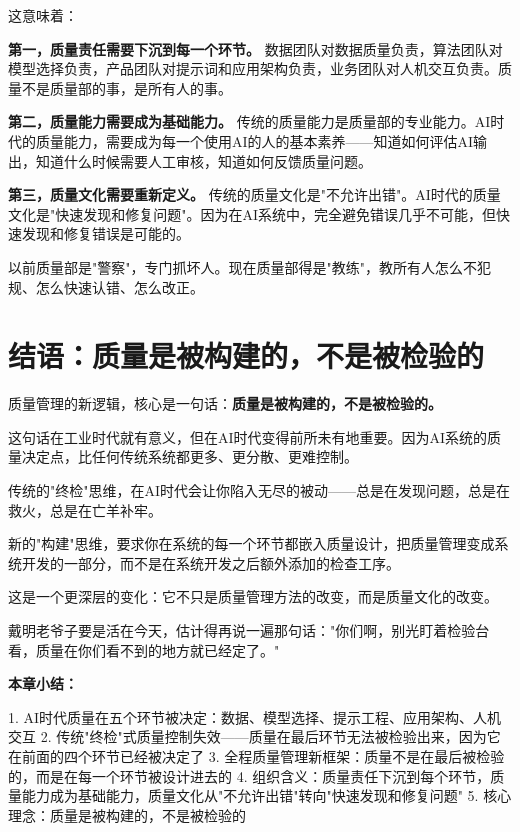 这意味着：

\textbf{第一，质量责任需要下沉到每一个环节。} 数据团队对数据质量负责，算法团队对模型选择负责，产品团队对提示词和应用架构负责，业务团队对人机交互负责。质量不是质量部的事，是所有人的事。

\textbf{第二，质量能力需要成为基础能力。} 传统的质量能力是质量部的专业能力。AI时代的质量能力，需要成为每一个使用AI的人的基本素养——知道如何评估AI输出，知道什么时候需要人工审核，知道如何反馈质量问题。

\textbf{第三，质量文化需要重新定义。} 传统的质量文化是"不允许出错"。AI时代的质量文化是"快速发现和修复问题"。因为在AI系统中，完全避免错误几乎不可能，但快速发现和修复错误是可能的。

以前质量部是"警察"，专门抓坏人。现在质量部得是"教练"，教所有人怎么不犯规、怎么快速认错、怎么改正。

\section{结语：质量是被构建的，不是被检验的}


质量管理的新逻辑，核心是一句话：\textbf{质量是被构建的，不是被检验的。}

这句话在工业时代就有意义，但在AI时代变得前所未有地重要。因为AI系统的质量决定点，比任何传统系统都更多、更分散、更难控制。

传统的"终检"思维，在AI时代会让你陷入无尽的被动——总是在发现问题，总是在救火，总是在亡羊补牢。

新的"构建"思维，要求你在系统的每一个环节都嵌入质量设计，把质量管理变成系统开发的一部分，而不是在系统开发之后额外添加的检查工序。

这是一个更深层的变化：它不只是质量管理方法的改变，而是质量文化的改变。

戴明老爷子要是活在今天，估计得再说一遍那句话："你们啊，别光盯着检验台看，质量在你们看不到的地方就已经定了。"


\textbf{本章小结：}

1. AI时代质量在五个环节被决定：数据、模型选择、提示工程、应用架构、人机交互
2. 传统"终检"式质量控制失效——质量在最后环节无法被检验出来，因为它在前面的四个环节已经被决定了
3. 全程质量管理新框架：质量不是在最后被检验的，而是在每一个环节被设计进去的
4. 组织含义：质量责任下沉到每个环节，质量能力成为基础能力，质量文化从"不允许出错"转向"快速发现和修复问题"
5. 核心理念：质量是被构建的，不是被检验的
